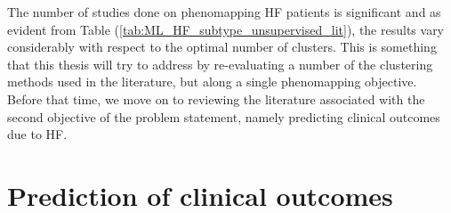 \documentclass[../thesis.tex]{subfiles}
\begin{document}
\indent The number of studies done on phenomapping HF patients is significant and as evident from Table (\ref{tab:ML_HF_subtype_unsupervised_lit}), the results vary considerably with respect to the optimal number of clusters. This is something that this thesis will try to address by re-evaluating a number of the clustering methods used in the literature, but along a single phenomapping objective. Before that time, we move on to reviewing the literature associated with the second objective of the problem statement, namely predicting clinical outcomes due to HF.

\section{Prediction of clinical outcomes}
\label{sec:predclincout}
\end{document}
